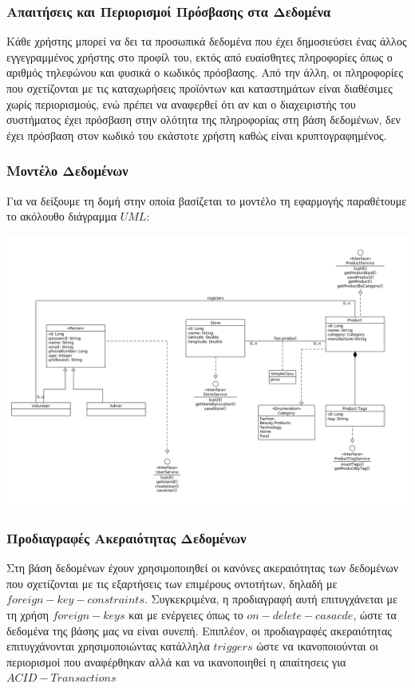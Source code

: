 \documentclass[12pt]{article}
\begin{document}
\subsubsection{Απαιτήσεις και Περιορισμοί Πρόσβασης στα Δεδομένα}

Κάθε χρήστης μπορεί να δει τα προσωπικά δεδομένα που έχει δημοσιεύσει ένας άλλος εγγεγραμμένος χρήστης στο προφίλ του, εκτός από ευαίσθητες πληροφορίες όπως ο αριθμός τηλεφώνου και φυσικά ο κωδικός πρόσβασης. Από την άλλη, οι πληροφορίες που σχετίζονται με τις καταχωρήσεις προϊόντων και καταστημάτων είναι διαθέσιμες χωρίς περιορισμούς, ενώ πρέπει να αναφερθεί ότι αν και ο διαχειριστής του συστήματος έχει πρόσβαση στην ολότητα της πληροφορίας στη βάση δεδομένων, δεν έχει πρόσβαση στον κωδικό του εκάστοτε χρήστη καθώς είναι κρυπτογραφημένος.

\subsubsection{Μοντέλο Δεδομένων}

Για να δείξουμε τη δομή στην οποία βασίζεται το μοντέλο τη εφαρμογής παραθέτουμε το ακόλουθο διάγραμμα $UML$:

\begin{center}
\includegraphics[scale=0.35]{UML/classDiagram.png}
\end{center}


\subsubsection{Προδιαγραφές Ακεραιότητας Δεδομένων}

Στη βάση δεδομένων έχουν χρησιμοποιηθεί οι κανόνες ακεραιότητας των δεδομένων που σχετίζονται με τις εξαρτήσεις των επιμέρους οντοτήτων, δηλαδή με $foreign-key-constraints$. Συγκεκριμένα, η προδιαγραφή αυτή επιτυγχάνεται με τη χρήση $foreign-keys$ και με ενέργειες όπως το $on-delete-casacde$, ώστε τα δεδομένα της βάσης μας να είναι συνεπή. Επιπλέον, οι προδιαγραφές ακεραιότητας επιτυγχάνονται χρησιμοποιώντας κατάλληλα $triggers$ ώστε να ικανοποιούνται οι περιορισμοί που αναφέρθηκαν αλλά και να ικανοποιηθεί η απαίτησεις για $ACID-Transactions$
\end{document}

